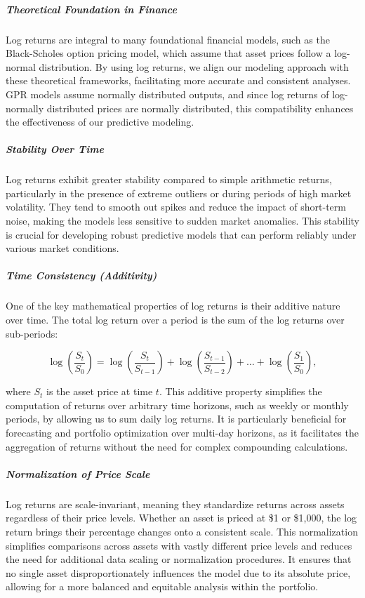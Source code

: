 \subparagraph{Theoretical Foundation in Finance}

Log returns are integral to many foundational financial models, such as the Black-Scholes option pricing model, which assume that asset prices follow a log-normal distribution. By using log returns, we align our modeling approach with these theoretical frameworks, facilitating more accurate and consistent analyses. \ac{GPR} models assume normally distributed outputs, and since log returns of log-normally distributed prices are normally distributed, this compatibility enhances the effectiveness of our predictive modeling.

\subparagraph{Stability Over Time}

Log returns exhibit greater stability compared to simple arithmetic returns, particularly in the presence of extreme outliers or during periods of high market volatility. They tend to smooth out spikes and reduce the impact of short-term noise, making the models less sensitive to sudden market anomalies. This stability is crucial for developing robust predictive models that can perform reliably under various market conditions.

\subparagraph{Time Consistency (Additivity)}

One of the key mathematical properties of log returns is their additive nature over time. The total log return over a period is the sum of the log returns over sub-periods:

\begin{equation}
\log\left( \frac{S_t}{S_0} \right) = \log\left( \frac{S_t}{S_{t-1}} \right) + \log\left( \frac{S_{t-1}}{S_{t-2}} \right) + \dots + \log\left( \frac{S_1}{S_0} \right),
\end{equation}

where $S_t$ is the asset price at time $t$. This additive property simplifies the computation of returns over arbitrary time horizons, such as weekly or monthly periods, by allowing us to sum daily log returns. It is particularly beneficial for forecasting and portfolio optimization over multi-day horizons, as it facilitates the aggregation of returns without the need for complex compounding calculations.

\subparagraph{Normalization of Price Scale}

Log returns are scale-invariant, meaning they standardize returns across assets regardless of their price levels. Whether an asset is priced at \$1 or \$1,000, the log return brings their percentage changes onto a consistent scale. This normalization simplifies comparisons across assets with vastly different price levels and reduces the need for additional data scaling or normalization procedures. It ensures that no single asset disproportionately influences the model due to its absolute price, allowing for a more balanced and equitable analysis within the portfolio.


